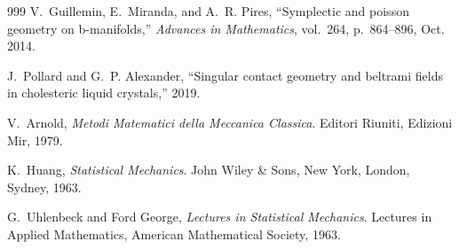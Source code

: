 \documentclass[10pt,a4paper]{article}
\begin{document}
\begin{thebibliography}{999}
V.~Guillemin, E.~Miranda, and A.~R. Pires, ``Symplectic and poisson geometry on
  b-manifolds,'' {\em Advances in Mathematics}, vol.~264, p.~864–896, Oct.
  2014.

J.~Pollard and G.~P. Alexander, ``Singular contact geometry and beltrami fields
  in cholesteric liquid crystals,'' 2019.

V.~{A}rnold, {\em Metodi Matematici della Meccanica Classica}.
\newblock Editori Riuniti, Edizioni Mir, 1979.

K.~{H}uang, {\em Statistical Mechanics}.
\newblock John Wiley \& Sons, New York, London, Sydney, 1963.

G.~{U}hlenbeck and {F}ord George, {\em {Lectures in Statistical Mechanics}}.
\newblock Lectures in Applied Mathematics, American Mathematical Society, 1963.
\end{thebibliography}
\end{document}
